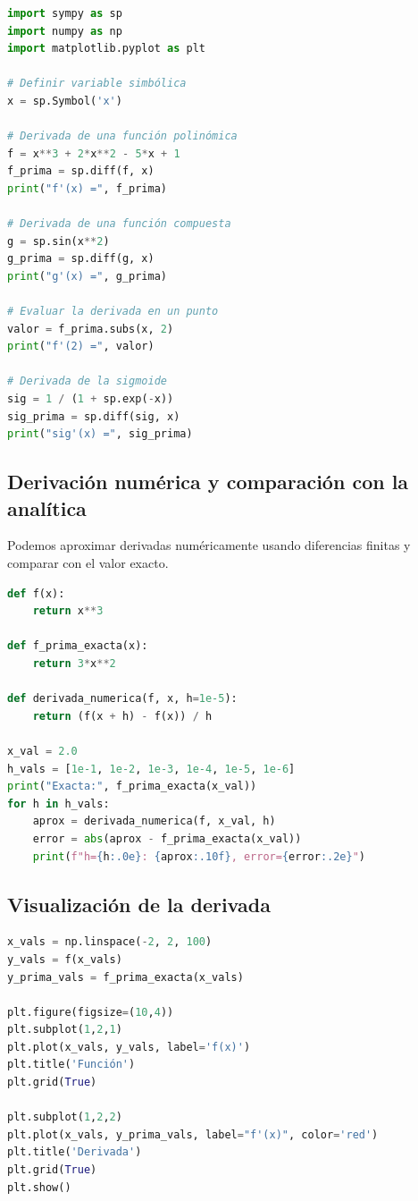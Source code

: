 \documentclass[12pt,a4paper,openany,oneside]{book}
\begin{document}
\begin{lstlisting}[language=Python]
import sympy as sp
import numpy as np
import matplotlib.pyplot as plt

# Definir variable simbólica
x = sp.Symbol('x')

# Derivada de una función polinómica
f = x**3 + 2*x**2 - 5*x + 1
f_prima = sp.diff(f, x)
print("f'(x) =", f_prima)

# Derivada de una función compuesta
g = sp.sin(x**2)
g_prima = sp.diff(g, x)
print("g'(x) =", g_prima)

# Evaluar la derivada en un punto
valor = f_prima.subs(x, 2)
print("f'(2) =", valor)

# Derivada de la sigmoide
sig = 1 / (1 + sp.exp(-x))
sig_prima = sp.diff(sig, x)
print("sig'(x) =", sig_prima)
\end{lstlisting}

\subsection{Derivación numérica y comparación con la analítica}
Podemos aproximar derivadas numéricamente usando diferencias finitas y comparar con el valor exacto.

\begin{lstlisting}[language=Python]
def f(x):
    return x**3

def f_prima_exacta(x):
    return 3*x**2

def derivada_numerica(f, x, h=1e-5):
    return (f(x + h) - f(x)) / h

x_val = 2.0
h_vals = [1e-1, 1e-2, 1e-3, 1e-4, 1e-5, 1e-6]
print("Exacta:", f_prima_exacta(x_val))
for h in h_vals:
    aprox = derivada_numerica(f, x_val, h)
    error = abs(aprox - f_prima_exacta(x_val))
    print(f"h={h:.0e}: {aprox:.10f}, error={error:.2e}")
\end{lstlisting}

\subsection{Visualización de la derivada}
\begin{lstlisting}[language=Python]
x_vals = np.linspace(-2, 2, 100)
y_vals = f(x_vals)
y_prima_vals = f_prima_exacta(x_vals)

plt.figure(figsize=(10,4))
plt.subplot(1,2,1)
plt.plot(x_vals, y_vals, label='f(x)')
plt.title('Función')
plt.grid(True)

plt.subplot(1,2,2)
plt.plot(x_vals, y_prima_vals, label="f'(x)", color='red')
plt.title('Derivada')
plt.grid(True)
plt.show()
\end{lstlisting}
\end{document}
